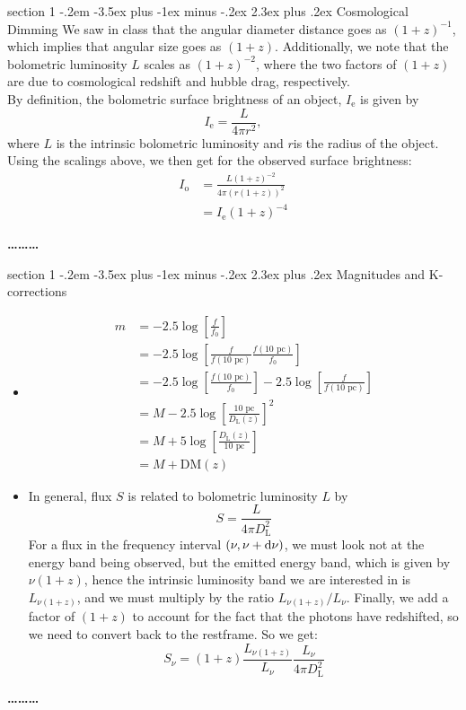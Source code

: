 \documentclass[12pt]{article}
\makeatletter
\newenvironment{problem}{\@startsection
	{section}
	{1}
	{-.2em}
	{-3.5ex plus -1ex minus -.2ex}
	{2.3ex plus .2ex}
	{\pagebreak[3]%
		\large\bf\noindent{Problem }
	}
}
{%
	\begin{center}\large\bf \ldots\ldots\ldots\end{center}}
\makeatother
\begin{document}
	\begin{problem}{Cosmological Dimming}
		We saw in class that the angular diameter distance goes as $(1+z)^{-1}$, which implies that angular size goes as $(1+z)$. Additionally, we note that the bolometric luminosity $L$ scales as $(1+z)^{-2}$, where the two factors of $(1+z)$ are due to cosmological redshift and hubble drag, respectively.\\
		
		By definition, the bolometric surface brightness of an object, $I_\mathrm{e}$ is given by \begin{equation*}
			I_\mathrm{e} = \frac{L}{4\pi r^2},
		\end{equation*} where $L$ is the intrinsic bolometric luminosity and $r$is the radius of the object.  Using the scalings above, we then get for the observed surface brightness: \begin{align*}
			I_\mathrm{o} &= \frac{L (1+z)^{-2} }{4\pi \left(r(1 + z)\right)^2}
			\\
			&= I_\mathrm{e} (1+z)^{-4}
		\end{align*}
		
	\end{problem}
	
	\begin{problem}{Magnitudes and K-corrections}
		\begin{itemize}
			\item \begin{align*}
				m &= -2.5 \log \left[\frac{f}{f_0}\right]
				\\
				&= -2.5 \log \left[\frac{f}{f(10\text{ pc})}\frac{f(10\text{ pc})}{f_0}\right]
				\\
				&= -2.5 \log \left[\frac{f(10\text{ pc})}{f_0}\right] -2.5 \log \left[\frac{f}{f(10\text{ pc})}\right] 
				\\
				&= M -2.5 \log \left[\frac{10\text{ pc}}{D_\mathrm{L}(z)}\right]^2
				\\
				&= M +5 \log \left[\frac{D_\mathrm{L}(z)}{10\text{ pc}}\right]
				\\
				&= M + \mathrm{DM}(z)
			\end{align*}
			
			\item In general, flux $S$ is related to bolometric luminosity $L$ by \begin{equation*}
				S = \frac{L}{4\pi D_\mathrm{L}^2}
			\end{equation*} For a flux in the frequency interval $(\nu,\nu + \dif\nu)$, we must look not at the energy band being observed, but the emitted energy band, which is given by $\nu(1 + z)$, hence the intrinsic luminosity band we are interested in is $L_{\nu(1+z)}$, and we must multiply by the ratio $L_{\nu(1+z)}/L_\nu$.  Finally, we add a factor of $(1+z)$ to account for the fact that the photons have redshifted, so we need to convert back to the restframe.  So we get:  \begin{equation*}
				S_\nu = (1+z) \frac{L_{\nu(1+z)}}{L_\nu} \frac{L_\nu}{4\pi D_\mathrm{L}^2}
			\end{equation*}
		\end{itemize}
		
	\end{problem}
	
\end{document}
